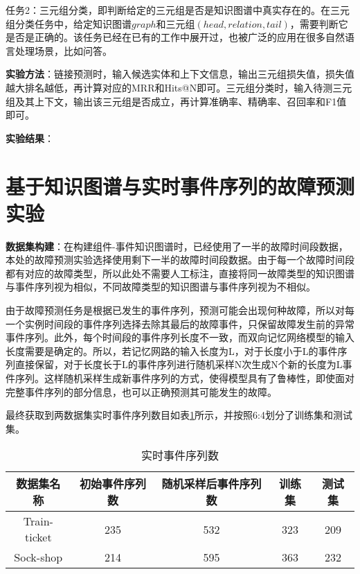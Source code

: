 任务2：三元组分类，即判断给定的三元组是否是知识图谱中真实存在的。在三元组分类任务中，给定知识图谱$graph$和三元组$(head,relation,tail)$，需要判断它是否是正确的。该任务已经在已有的工作\parencite{bordes2013translating,wang2014knowledge,lin2015learning}中展开过，也被广泛的应用在很多自然语言处理场景，比如问答。

\textbf{实验方法}：链接预测时，输入候选实体和上下文信息，输出三元组损失值，损失值越大排名越低，再计算对应的MRR和Hits@N即可。三元组分类时，输入待测三元组及其上下文，输出该三元组是否成立，再计算准确率、精确率、召回率和F1值即可。

\textbf{实验结果}：


\section{基于知识图谱与实时事件序列的故障预测实验}
\textbf{数据集构建}：在构建组件-事件知识图谱时，已经使用了一半的故障时间段数据，本处的故障预测实验选择使用剩下一半的故障时间段数据。由于每一个故障时间段都有对应的故障类型，所以此处不需要人工标注，直接将同一故障类型的知识图谱与事件序列视为相似，不同故障类型的知识图谱与事件序列视为不相似。

由于故障预测任务是根据已发生的事件序列，预测可能会出现何种故障，所以对每一个实例时间段的事件序列选择去除其最后的故障事件，只保留故障发生前的异常事件序列。此外，每个时间段的事件序列长度不一致，而双向记忆网络模型的输入长度需要是确定的。所以，若记忆网路的输入长度为L，对于长度小于L的事件序列直接保留，对于长度长于L的事件序列进行随机采样N次生成N个新的长度为L事件序列。这样随机采样生成新事件序列的方式，使得模型具有了鲁棒性，即使面对完整事件序列的部分信息，也可以正确预测其可能发生的故障。

最终获取到两数据集实时事件序列数目如表\ref{event-sequence-num}所示，并按照6:4划分了训练集和测试集。
\begin{table}[htbp]
    \centering
    \caption{实时事件序列数}
    \label{event-sequence-num}
    \begin{tabular}{ccccc}
        \hline
        数据集名称        & 初始事件序列数 & 随机采样后事件序列数 & 训练集 & 测试集 \\ \hline
        Train-ticket & 235     & 532     & 323 & 209 \\
        Sock-shop    & 214     & 595     & 363 & 232 \\ \hline
    \end{tabular}
\end{table}

